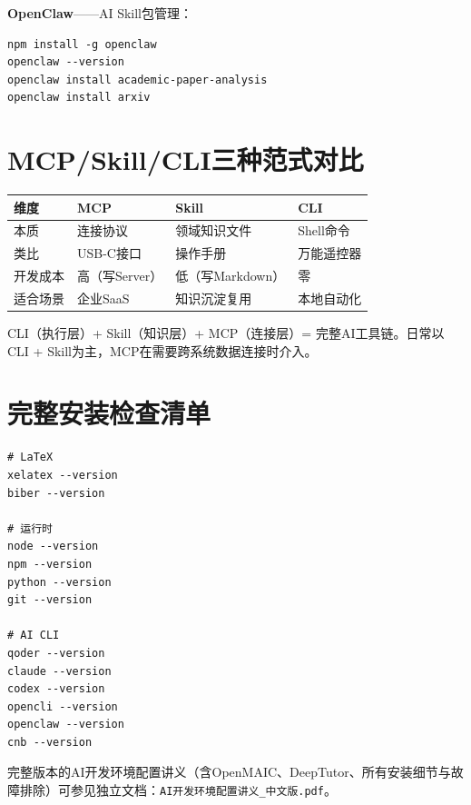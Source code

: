 \textbf{OpenClaw}——AI Skill包管理：

\begin{lstlisting}[style=shell]
npm install -g openclaw
openclaw --version
openclaw install academic-paper-analysis
openclaw install arxiv
\end{lstlisting}

\section{MCP/Skill/CLI三种范式对比}

\begin{table}[H]
\centering
\begin{tabular}{llll}
\toprule
\textbf{维度} & \textbf{MCP} & \textbf{Skill} & \textbf{CLI} \\
\midrule
本质 & 连接协议 & 领域知识文件 & Shell命令 \\
类比 & USB-C接口 & 操作手册 & 万能遥控器 \\
开发成本 & 高（写Server） & 低（写Markdown） & 零 \\
适合场景 & 企业SaaS & 知识沉淀复用 & 本地自动化 \\
\bottomrule
\end{tabular}
\end{table}

\begin{notebox}[黄金组合]
CLI（执行层）+ Skill（知识层）+ MCP（连接层）= 完整AI工具链。日常以CLI + Skill为主，MCP在需要跨系统数据连接时介入。
\end{notebox}

\section{完整安装检查清单}

\begin{lstlisting}[style=shell]
# LaTeX
xelatex --version
biber --version

# 运行时
node --version
npm --version
python --version
git --version

# AI CLI
qoder --version
claude --version
codex --version
opencli --version
openclaw --version
cnb --version
\end{lstlisting}

\begin{notebox}[参考文档]
完整版本的AI开发环境配置讲义（含OpenMAIC、DeepTutor、所有安装细节与故障排除）可参见独立文档：\texttt{AI开发环境配置讲义\_中文版.pdf}。
\end{notebox}

